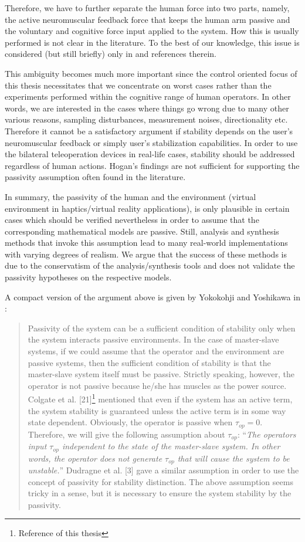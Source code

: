 Therefore, we have to further separate the human force into two parts, namely, the active neuromuscular feedback force that keeps the 
human arm passive and the voluntary and cognitive force input applied to the system. How this is usually performed is not clear in the 
literature. To the best of our knowledge, this issue is considered (but still briefly) only in \cite[Sec. II.B]{kazeroonitsay} and 
references therein.


This ambiguity becomes much more important since the control oriented focus of this thesis necessitates that we concentrate on
worst cases rather than the experiments performed within the cognitive range of human operators. In other words, we are interested in
the cases where things go wrong due to many other various reasons, sampling disturbances, measurement noises, directionality etc. Therefore
it cannot be a satisfactory argument if stability depends on the user's neuromuscular feedback or simply user's stabilization capabilities. 
In order to use the bilateral teleoperation devices in real-life cases, stability should be addressed regardless of human actions. Hogan's 
findings are not sufficient for supporting the passivity assumption often found in the literature. 


In summary, the passivity of the human and the environment (virtual environment in haptics/virtual reality applications), is 
only plausible in certain cases which should be verified nevertheless in order to assume that the corresponding mathematical models 
are passive. Still, analysis and synthesis methods that invoke this assumption lead to many real-world implementations 
with varying degrees of realism. We argue that the success of these methods is due to the conservatism of the analysis/synthesis tools
and does not validate the passivity hypotheses on the respective models.


A compact version of the argument above is given by Yokokohji and Yoshikawa in \cite{yokokohjiyoshikawa}: 
\begin{quote}
Passivity of the system can be a
sufficient condition of stability only when the system interacts
passive environments. In the case of master-slave systems, if
we could assume that the operator and the environment are
passive systems, then the sufficient condition of stability is
that the master-slave system itself must be passive. Strictly
speaking, however, the operator is not passive because he/she
has muscles as the power source. Colgate et al. [21]\footnote{Reference 
\cite{colgatehogan88} of this thesis} mentioned
that even if the system has an active term, the system stability
is guaranteed unless the active term is in some way state dependent.
Obviously, the operator is passive when $\tau_{op}= 0$.
Therefore, we will give the following assumption about $\tau_{op}$:
\enquote{\emph{The operators input $\tau_{op}$ independent to the state of the
master-slave system. In other words, the operator does not
generate $\tau_{op}$ that will cause the system to be unstable.}}
Dudragne et al. [3] gave a similar assumption in order to use
the concept of passivity for stability distinction. The above
assumption seems tricky in a sense, but it is necessary to ensure
the system stability by the passivity.
\end{quote}

